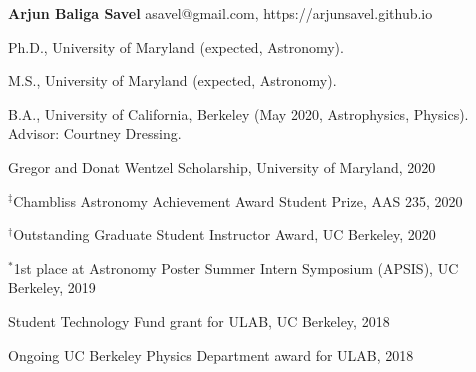 \documentclass[12pt,letterpaper]{article}
\begin{document}
\thispagestyle{empty}\sloppy\sloppypar\raggedbottom

\textbf{\Large Arjun Baliga Savel} \hfill
\textsf{\small asavel@gmail.com, https://arjunsavel.github.io} \\

\begin{list}{}{\cvlist}
\item
Ph.D., University of Maryland (expected, Astronomy).
\item
M.S., University of Maryland (expected, Astronomy).
\item
B.A., University of California, Berkeley (May 2020, Astrophysics, Physics). Advisor: Courtney Dressing.
\end{list}

\begin{list}{}{\cvlist}

\item Gregor and Donat Wentzel Scholarship, University of Maryland, 2020
\item $^\ddagger$Chambliss Astronomy Achievement Award Student Prize, AAS 235, 2020
\item $^\dagger$Outstanding Graduate Student Instructor Award, UC Berkeley, 2020
\item $^*$1st place at Astronomy Poster Summer Intern Symposium (APSIS), UC Berkeley, 2019
\item Student Technology Fund grant for ULAB, UC Berkeley, 2018
\item Ongoing UC Berkeley Physics Department award for ULAB, 2018

\end{list}


\ifdefined\withpubs
    

    \begin{list}{}{\cvlist}
    
    \end{list}

    \begin{list}{}{\cvlist}
    
    \end{list}
\fi
\end{document}
